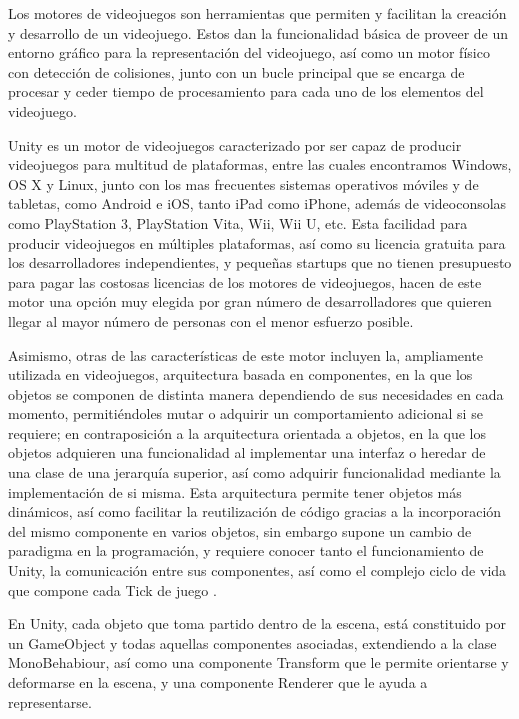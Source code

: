 Los motores de videojuegos son herramientas que permiten y facilitan la creación y desarrollo de un videojuego. Estos dan la funcionalidad básica de proveer de un entorno gráfico para la representación del videojuego, así como un motor físico con detección de colisiones, junto con un bucle principal que se encarga de procesar y ceder tiempo de procesamiento para cada uno de los elementos del videojuego.

Unity es un motor de videojuegos caracterizado por ser capaz de producir videojuegos para multitud de plataformas, entre las cuales encontramos Windows, OS X y Linux, junto con los mas frecuentes sistemas operativos móviles y de tabletas, como Android e  iOS, tanto iPad como iPhone, además de videoconsolas como PlayStation 3, PlayStation Vita, Wii, Wii U, etc. Esta facilidad para producir videojuegos en múltiples plataformas, así como su licencia gratuita para los desarrolladores independientes, y pequeñas startups que no tienen presupuesto para pagar las costosas licencias de los motores de videojuegos, hacen de este motor una opción muy elegida por gran número de desarrolladores que quieren llegar al mayor número de personas con el menor esfuerzo posible.

Asimismo, otras de las características de este motor incluyen la, ampliamente utilizada en videojuegos, arquitectura basada en componentes, en la que los objetos se componen de distinta manera dependiendo de sus necesidades en cada momento, permitiéndoles mutar o adquirir un comportamiento adicional si se requiere; en contraposición a la arquitectura orientada a objetos, en la que los objetos adquieren una funcionalidad al implementar una interfaz o heredar de una clase de una jerarquía superior, así como adquirir funcionalidad mediante la implementación de si misma. Esta arquitectura permite tener objetos más dinámicos, así como facilitar la reutilización de código gracias a la incorporación del mismo componente en varios objetos, sin embargo supone un cambio de paradigma en la programación, y requiere conocer tanto el funcionamiento de Unity, la comunicación entre sus componentes, así como el complejo ciclo de vida que compone cada Tick de juego \cite{unitymanual}.

En Unity, cada objeto que toma partido dentro de la escena, está constituido por un GameObject y todas aquellas componentes asociadas, extendiendo a la clase MonoBehabiour, así como una componente Transform que le permite orientarse y deformarse en la escena, y una componente Renderer que le ayuda a representarse.

